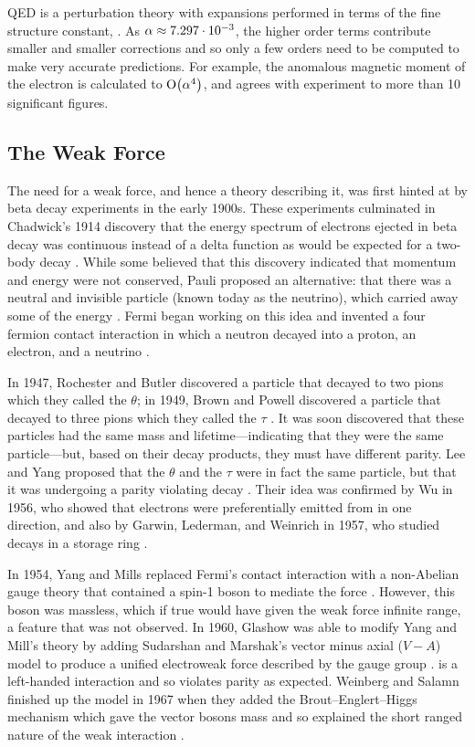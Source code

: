 QED is a perturbation theory with expansions performed in terms of the fine
structure constant, \fsc. As $\alpha \approx 7.297 \cdot 10^{-3}$, the higher
order terms contribute smaller and smaller corrections and so only a few orders
need to be computed to make very accurate predictions. For example, the
anomalous magnetic moment of the electron is calculated to $\operatorname{O}\!\left( \alpha^{4} \right)$,
and agrees with experiment to more than \num{10} significant figures.

\subsection{The Weak Force}
\label{subsection:weak_force}

The need for a weak force, and hence a theory describing it, was first hinted
at by beta decay experiments in the early 1900s. These experiments culminated
in Chadwick's 1914 discovery that the energy spectrum of electrons ejected in
beta decay was continuous instead of a delta function as would be expected for
a two-body decay \cite{chadwick1914}. While some believed that this discovery
indicated that momentum and energy were not conserved, Pauli proposed an
alternative: that there was a neutral and invisible particle (known today as
the neutrino), which carried away some of the energy \cite{pauli1930}. Fermi
began working on this idea and invented a four fermion contact interaction in
which a neutron decayed into a proton, an electron, and a neutrino
\cite{fermi1934}.

In 1947, Rochester and Butler discovered a particle that decayed to two pions
which they called the $\theta$; in 1949, Brown and Powell discovered a particle
that decayed to three pions which they called the $\tau$
\cite{Rochester1947,brown1949}. It was soon discovered that these particles had
the same mass and lifetime---indicating that they were the same particle---but,
based on their decay products, they must have different parity. Lee and Yang
proposed that the $\theta$ and the $\tau$ were in fact the same particle, but
that it was undergoing a parity violating decay \cite{lee1956}. Their idea was
confirmed by Wu in 1956, who showed that electrons were preferentially emitted
from \cobaltsixty in one direction, and also by Garwin, Lederman, and Weinrich
in 1957, who studied \pitomunu decays in a storage ring
\cite{wu1956,garwin1957}.

In 1954, Yang and Mills replaced Fermi's contact interaction with a non-Abelian
gauge theory that contained a spin-1 boson to mediate the force
\cite{yang1954}. However, this boson was massless, which if true would have
given the weak force infinite range, a feature that was not observed. In 1960,
Glashow was able to modify Yang and Mill's theory by adding Sudarshan and
Marshak's vector minus axial ($V-A$) model to produce a unified electroweak
force described by the \SUtwoUone gauge group \cite{glashow1961,sudarshan1958}.
\SUtwo is a left-handed interaction and so violates parity as expected.
Weinberg and Salamn finished up the model in 1967 when they added the
Brout--Englert--Higgs mechanism which gave the vector bosons mass and so
explained the short ranged nature of the weak interaction
\cite{weinberg1967,salam1968,englert1964,higgs1964}.

